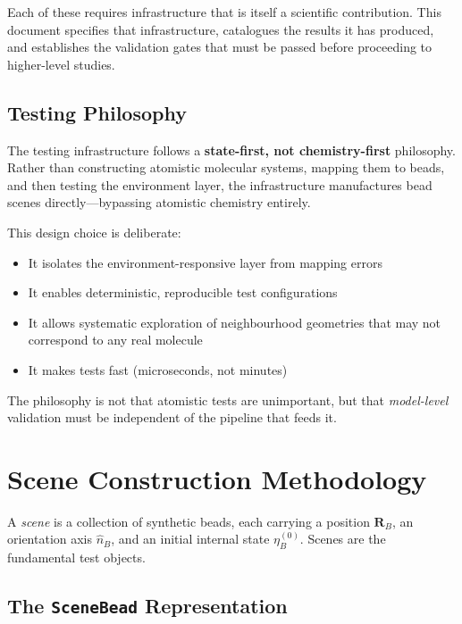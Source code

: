 \documentclass[11pt]{article}
\newcommand{\type}[1]{\texttt{#1}}
\begin{document}
Each of these requires infrastructure that is itself a scientific
contribution.  This document specifies that infrastructure, catalogues the
results it has produced, and establishes the validation gates that must be
passed before proceeding to higher-level studies.

\subsection{Testing Philosophy}

The testing infrastructure follows a \textbf{state-first, not
chemistry-first} philosophy.  Rather than constructing atomistic molecular
systems, mapping them to beads, and then testing the environment layer, the
infrastructure manufactures bead scenes directly---bypassing atomistic
chemistry entirely.

This design choice is deliberate:

\begin{itemize}
    \item It isolates the environment-responsive layer from mapping errors
    \item It enables deterministic, reproducible test configurations
    \item It allows systematic exploration of neighbourhood geometries
          that may not correspond to any real molecule
    \item It makes tests fast (microseconds, not minutes)
\end{itemize}

The philosophy is not that atomistic tests are unimportant, but that
\emph{model-level} validation must be independent of the pipeline that
feeds it.

\section{Scene Construction Methodology}
\label{sec:scenes}

A \emph{scene} is a collection of synthetic beads, each carrying a
position $\mathbf{R}_B$, an orientation axis $\hat{n}_B$, and an initial
internal state $\eta_B^{(0)}$.  Scenes are the fundamental test objects.

\subsection{The \type{SceneBead} Representation}
\end{document}
